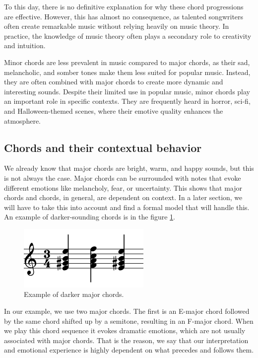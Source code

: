 To this day, there is no definitive explanation for why these chord progressions are effective. However, this has almost no consequence, as talented songwriters often create remarkable music without relying heavily on music theory. In practice, the knowledge of music theory often plays a secondary role to creativity and intuition.

Minor chords are less prevalent in music compared to major chords, as their sad, melancholic, and somber tones make them less suited for popular music. Instead, they are often combined with major chords to create more dynamic and interesting sounds. Despite their limited use in popular music, minor chords play an important role in specific contexts. They are frequently heard in horror, sci-fi, and Halloween-themed scenes, where their emotive quality enhances the atmosphere.

\subsection*{Chords and their contextual behavior}
We already know that major chords are bright, warm, and happy sounds, but this is not always the case. Major chords can be surrounded with notes that evoke different emotions like melancholy, fear, or uncertainty. This shows that major chords and chords, in general, are dependent on context. In a later section, we will have to take this into account and find a formal model that will handle this. An example of darker-sounding chords is in the figure \ref{fig:darkmajorchords}.

\begin{figure}[H]
    \centering
    \includegraphics[scale=0.55]{obrazky-figures/chords.png}
    \caption{Example of darker major chords.}
    \label{fig:darkmajorchords}
\end{figure}

In our example, we use two major chords. The first is an E-major chord followed by the same chord shifted up by a semitone, resulting in an F-major chord. When we play this chord sequence it evokes dramatic emotions, which are not usually associated with major chords. That is the reason, we say that our interpretation and emotional experience is highly dependent on what precedes and follows them.

